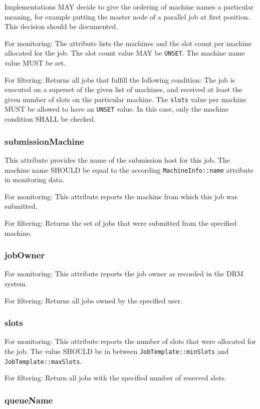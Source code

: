\documentclass{article}
\newcommand{\h}[1]{\lstinline|#1|}
\begin{document}
Implementations MAY decide to give the ordering of machine names a particular meaning, for example putting the master node of a parallel job at first position. This decision should be documented.

For monitoring: The attribute lists the machines and the slot count per machine allocated for the job. The slot count value MAY be \h{UNSET}. The machine name value MUST be set.

For filtering: Returns all jobs that fulfill the following condition: The job is executed on a superset of the given list of machines, and received at least the given number of slots on the particular machine. The \h{slots} value per machine MUST be allowed to have an \h{UNSET} value. In this case, only the machine condition SHALL be checked.

\subsubsection{submissionMachine}

This attribute provides the name of the submission host for this job. The machine name SHOULD be equal to the according \h{MachineInfo::name} attribute in monitoring data.

For monitoring: This attribute reports the machine from which this job was submitted.

For filtering: Returns the set of jobs that were submitted from the specified machine.

\subsubsection{jobOwner}

For monitoring: This attribute reports the job owner as recorded in the DRM system.

For filtering: Returns all jobs owned by the specified user.

\subsubsection{slots}

For monitoring: This attribute reports the number of slots that were allocated for the job. The value SHOULD be in between \h{JobTemplate::minSlots} and \h{JobTemplate::maxSlots}.

For filtering: Return all jobs with the specified number of reserved slots.

\subsubsection{queueName}
\end{document}
